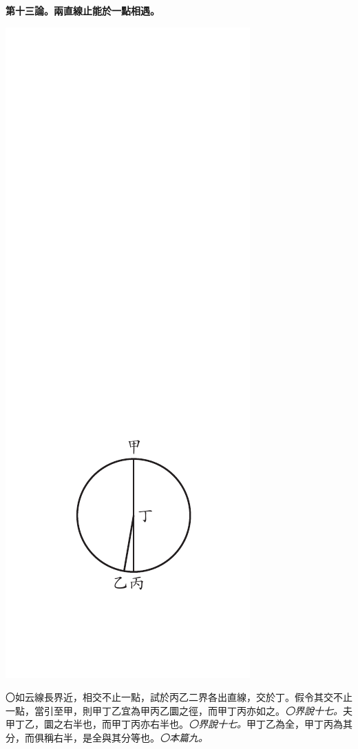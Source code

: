 \documentclass[12pt,b5paper,landscape]{article}
\newcommand{\ccom}[1]{{\footnotesize \emph{〇#1}}}
\newcommand{\bcom}[1]{〇#1}
\newcommand{\cthm}[1]{{
\vspace{8pt}

\bfseries #1}}
\begin{document}
\begin{multicols}{2}
\cthm{第十三論。兩直線止能於一點相遇。}
\begin{center}
\includegraphics[angle=90]{eu31}
\end{center}
\bcom{如云線長界近，相交不止一點，試於丙乙二界各出直線，交於丁。假令其交不止一點，當引至甲，則甲丁乙宜為甲丙乙圜之徑，而甲丁丙亦如之。\ccom{界說十七。}夫甲丁乙，圜之右半也，而甲丁丙亦右半也。\ccom{界說十七。}甲丁乙為全，甲丁丙為其分，而俱稱右半，是全與其分等也。\ccom{本篇九。}}


\end{multicols}
\end{document}
